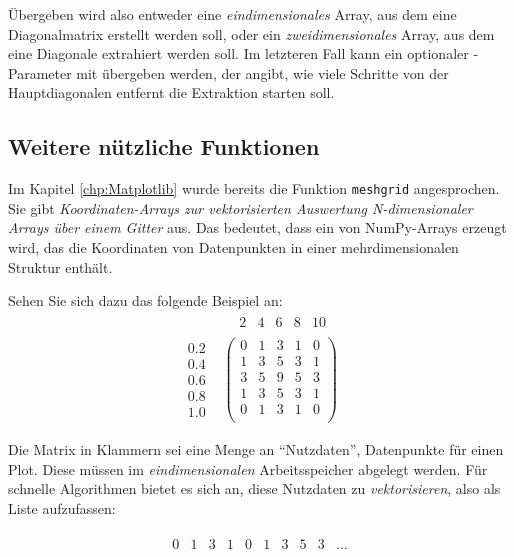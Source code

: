 Übergeben wird also entweder eine \emph{eindimensionales} Array, aus dem eine Diagonalmatrix erstellt werden soll, oder ein \emph{zweidimensionales} Array, aus dem eine Diagonale extrahiert werden soll. Im letzteren Fall kann ein optionaler -Parameter mit übergeben werden, der angibt, wie viele Schritte von der Hauptdiagonalen entfernt die Extraktion starten soll.

\subsection{Weitere nützliche Funktionen}
Im Kapitel \ref{chp:Matplotlib} wurde bereits die Funktion \texttt{meshgrid} angesprochen. Sie gibt \emph{Koordinaten-Arrays zur vektorisierten Auswertung N-dimensionaler Arrays über einem Gitter} aus. Das bedeutet, dass ein  von NumPy-Arrays erzeugt wird, das die Koordinaten von Datenpunkten in einer mehrdimensionalen Struktur enthält.

Sehen Sie sich dazu das folgende Beispiel an:
\begin{align*}
	&
	\begin{matrix}
		& 2 & 4 & 6 & 8 & 10
	\end{matrix}
\\
%
	\begin{matrix}
		0.2 \\ 0.4 \\ 0.6 \\ 0.8 \\ 1.0
	\end{matrix}
&
	\begin{pmatrix}
		0 & 1 & 3 & 1 & 0 \\
		1 & 3 & 5 & 3 & 1 \\
		3 & 5 & 9 & 5 & 3 \\
		1 & 3 & 5 & 3 & 1 \\
		0 & 1 & 3 & 1 & 0 \\
	\end{pmatrix}
\end{align*}

Die Matrix in Klammern sei eine Menge an \enquote{Nutzdaten}, \eg Datenpunkte für einen Plot. Diese müssen im \emph{eindimensionalen} Arbeitsspeicher abgelegt werden. Für schnelle Algorithmen bietet es sich an, diese Nutzdaten zu \emph{vektorisieren}, also als Liste aufzufassen:

\begin{align*}
	\begin{matrix}
		0 & 1 & 3 & 1 & 0 & 1 & 3 & 5 & 3 & \ldots
	\end{matrix}
\end{align*}

